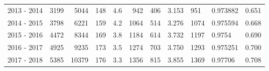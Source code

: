 \begin{tabular}{lrrrrrrrllr}
2013 - 2014 &     3199 &     5044 &               148 &               4.6 &                     942 &                        406 &       3.153 &           951 &   0.973882 &             0.651 \\
2014 - 2015 &     3798 &     6221 &               159 &               4.2 &                    1064 &                        514 &       3.276 &          1074 &   0.975594 &             0.668 \\
2015 - 2016 &     4472 &     8344 &               169 &               3.8 &                    1184 &                        614 &       3.732 &          1197 &     0.9754 &             0.690 \\
2016 - 2017 &     4925 &     9235 &               173 &               3.5 &                    1274 &                        703 &       3.750 &          1293 &   0.975251 &             0.700 \\
2017 - 2018 &     5385 &    10379 &               176 &               3.3 &                    1356 &                        815 &       3.855 &          1369 &    0.97706 &             0.708 \\
\bottomrule
\end{tabular}
